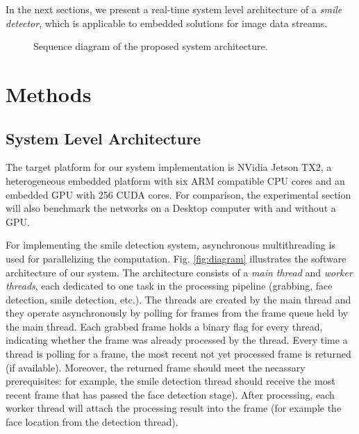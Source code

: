 \documentclass[conference]{IEEEtran}
\begin{document}
In the next sections, we present a real-time system level architecture of a \textit{smile detector}, which is applicable to embedded solutions for image data streams.%


\begin{figure*}
\vspace{1mm}
\caption{Sequence diagram of the proposed system architecture.}\label{fig:sequence}
\end{figure*}


\section{Methods}

\subsection{System Level Architecture}

The target platform for our system implementation is NVidia Jetson TX2, a heterogeneous embedded platform with six ARM compatible CPU cores and an embedded GPU with 256 CUDA cores. For comparison, the experimental section will also benchmark the networks on a Desktop computer with and without a GPU.

For implementing the smile detection system, asynchronous multithreading is used for parallelizing the computation.
Fig. \ref{fig:diagram} illustrates the software architecture of our system. %
The architecture consists of a \textit{main thread} and \textit{worker threads}, each dedicated to one task in the processing pipeline (grabbing, face detection, smile detection, etc.). The threads are created by the main thread and they operate asynchronously by polling for frames from the frame queue held by the main thread. Each grabbed frame holds a binary flag for every thread, indicating whether the frame was already processed by the thread. Every time a thread is polling for a frame, the most recent not yet processed frame is returned (if available). Moreover, the returned frame should meet the necassary prerequisites: for example, the smile detection thread should receive the most recent frame that has passed the face detection stage). After processing, each worker thread will attach the processing result into the frame (for example the face location from the detection thread).
\end{document}

